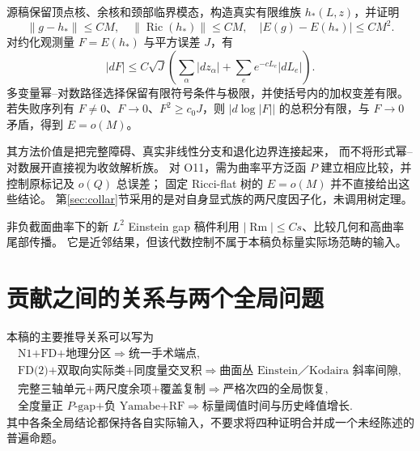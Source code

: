 \documentclass[UTF8,11pt,a4paper,fontset=none]{ctexart}
\numberwithin{equation}{section}
\theoremstyle{definition}
\theoremstyle{remark}\newtheorem{remark}[theorem]{说明}
\newcommand{\Ric}{\operatorname{Ric}}
\newcommand{\Rm}{\operatorname{Rm}}
\begin{document}
源稿保留顶点核、余核和颈部临界模态，构造真实有限维族 $h_*(L,z)$，并证明
\[
\|g-h_*\|\le CM,\quad\|\Ric(h_*)\|\le CM,
\quad |E(g)-E(h_*)|\le CM^2.
\]
对约化观测量 $F=E(h_*)$ 与平方误差 $J$，有
\[
|dF|\le C\sqrt J
\left(\sum_\alpha|dz_\alpha|+\sum_e e^{-cL_e}|dL_e|\right).
\]
多变量幂--对数路径选择保留有限符号条件与极限，并使括号内的加权变差有限。
若失败序列有 $F\ne0$、$F\to0$、$F^2\ge c_0J$，则
$|d\log|F||$ 的总积分有限，与 $F\to0$ 矛盾，得到 $E=o(M)$。

其方法价值是把完整障碍、真实非线性分支和退化边界连接起来，
而不将形式幂--对数展开直接视为收敛解析族。
对 O11，需为曲率平方泛函 $P$ 建立相应比较，并控制原标记及 $o(Q)$ 总误差；
固定 Ricci-flat 树的 $E=o(M)$ 并不直接给出这些结论。
第\ref{sec:collar}节采用的是对自身显式族的两尺度因子化，未调用树定理。

非负截面曲率下的新 $L^2$ Einstein gap 稿件\cite{OAI348}利用
$|\Rm|\le Cs$、比较几何和高曲率尾部传播。
它是近邻结果，但该代数控制不属于本稿负标量实际场范畴的输入。

\section{贡献之间的关系与两个全局问题}\label{sec:conclusion}

本稿的主要推导关系可以写为
\[
\begin{gathered}
\text{N1+FD+地理分区}\Longrightarrow\text{统一手术端点},\\
\text{FD(2)+双取向实际类+同度量交叉积}
\Longrightarrow\text{曲面丛 Einstein／Kodaira 斜率间隙},\\
\text{完整三轴单元+两尺度余项+覆盖复制}
\Longrightarrow\text{严格次四的全局恢复},\\
\text{全度量正 }P\text{-gap+负 Yamabe+RF}
\Longrightarrow\text{标量阈值时间与历史峰值增长}.
\end{gathered}
\]
其中各条全局结论都保持各自实际输入，不要求将四种证明合并成一个未经陈述的普遍命题。

\end{document}
